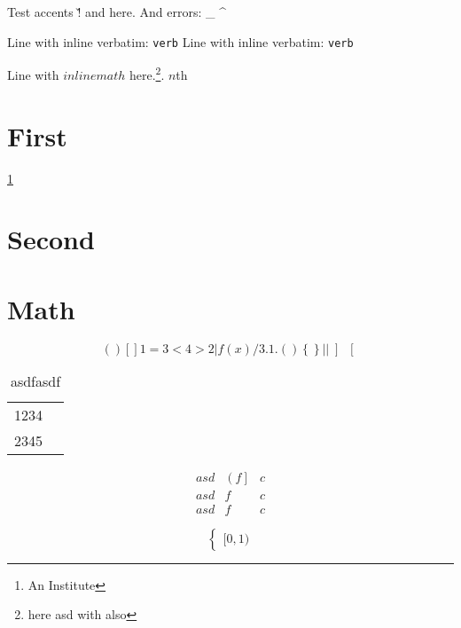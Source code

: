 \documentclass{article}
\begin{document}
Test accents \v! and \v@ here. And errors: _ ^

Line with inline verbatim: \verb+verb+
Line with inline verbatim: \verb*+verb+

Line with $inline math$ here.\footnote{here {asd} with \cmd also}. $n$th

\section{First}
\label{sec:first}

\ref{sec:first}
\pageref{sec:second}
\nocite{bibkey0}
\cite{bibkey1}
\citet*{bibkey2}
\citep{bibkey3}
\citep[e.g.][]{bibkey4}

\section{Second}
\label{sec:second}

\author{A. Author\thanks{An Institute}}

\section{Math}
\label{sec:math}

\begin{equation}
  ( )
  [ ]
  1 = 3 < 4 > 2 | f(x) / 3 .1.
  \left( \right)
  \left\{ \right\}
  \left\lvert \right\rvert
  \left] \right[
\end{equation}

\begin{table}
  \centering
  \caption{asdfasdf}
  \label{tab:}
  \begin{tabular}{cr}
    1234 \\
    2345 \\
  \end{tabular}
\end{table}

\begin{equation}
  \begin{array}{ccc}
    asd & \left( f \right] & c \\
    asd & f & c \\
    asd & f & c
  \end{array}
\end{equation}

\begin{equation}
  \begin{cases}
    [0,1)
  \end{cases}
\end{equation}
\end{document}
